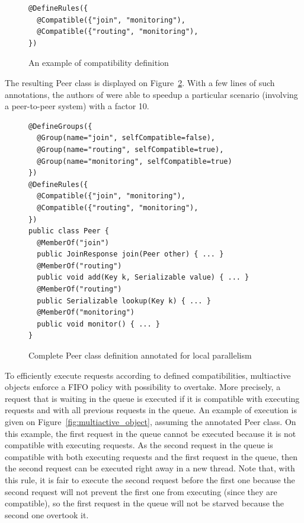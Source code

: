 \documentclass[11pt]{report}
\begin{document}
\begin{figure}[!ht]
	\lstset{language=java, numbers=left, numberstyle=\tiny, stepnumber=1, numbersep=5pt, basicstyle=\footnotesize}
	\begin{lstlisting}[frame=single]
@DefineRules({
  @Compatible({"join", "monitoring"),
  @Compatible({"routing", "monitoring"),
})
 	\end{lstlisting}
\caption{An example of compatibility definition}
\label{fig:compatible_annotation}
\end{figure}

The resulting Peer class is displayed on Figure~\ref{fig:annotated_peer_class}. With a few lines of such annotations, the authors of \cite{ref:mao} were able to speedup a particular scenario (involving a peer-to-peer system) with a factor 10.

\begin{figure}[!ht]
	\lstset{language=java, numbers=left, numberstyle=\tiny, stepnumber=1, numbersep=5pt, basicstyle=\footnotesize}
	\begin{lstlisting}[frame=single]
@DefineGroups({
  @Group(name="join", selfCompatible=false),
  @Group(name="routing", selfCompatible=true),
  @Group(name="monitoring", selfCompatible=true)
})
@DefineRules({
  @Compatible({"join", "monitoring"),
  @Compatible({"routing", "monitoring"),
})
public class Peer {
  @MemberOf("join")
  public JoinResponse join(Peer other) { ... }
  @MemberOf("routing")
  public void add(Key k, Serializable value) { ... }
  @MemberOf("routing")
  public Serializable lookup(Key k) { ... }
  @MemberOf("monitoring")
  public void monitor() { ... }
}
 	\end{lstlisting}
\caption{Complete Peer class definition annotated for local parallelism}
\label{fig:annotated_peer_class}
\end{figure}

To efficiently execute requests according to defined compatibilities, multiactive objects enforce a FIFO policy with possibility to overtake. More precisely, a request that is waiting in the queue is executed if it is compatible with executing requests and with all previous requests in the queue. An example of execution is given on Figure~\ref{fig:multiactive_object}, assuming the annotated Peer class. On this example, the first request in the queue cannot be executed because it is not compatible with executing requests. As the second request in the queue is compatible with both executing requests and the first request in the queue, then the second request can be executed right away in a new thread. Note that, with this rule, it is fair to execute the second request before the first one because the second request will not prevent the first one from executing (since they are compatible), so the first request in the queue will not be starved because the second one overtook it.
\end{document}
